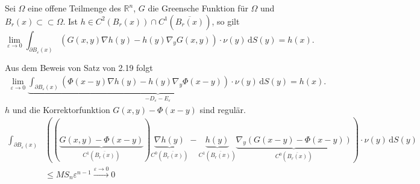 \begin{lemma}
	Sei $\Omega$ eine offene Teilmenge des $\mathbb{R}^n$, $G$ die Greensche Funktion für $\Omega$ und $B_r(x) \subset \subset \Omega$. 
	Ist $h \in C^2(B_r(x)) \cap C^1( \overline{B_r(x)})$, so gilt
	\begin{equation}
		\lim_{\varepsilon \to 0} \int_{\partial B _{\varepsilon}(x)}^{} \left( G(x,y)  \nabla h(y) - h(y)  \nabla_y G(x,y) \right) \cdot \nu(y) \,\mathrm{d}S(y) =
		h(x).
	\end{equation}
\end{lemma}
\begin{beweis}
	Aus dem Beweis von Satz von 2.19 folgt
	\begin{align*}
		\lim_{\varepsilon \to 0} \underset{-D_{\varepsilon}- E_{\varepsilon}}{\underbrace{\int_{\partial B_{\varepsilon}(x)}^{}\left( \Phi(x-y) 
		 \nabla h(y) - h(y)  \nabla_y \Phi(x-y) \right) \cdot \nu(y) \,\mathrm{d}S(y)}}=h(x).
	\end{align*}
	$h$ und die Korrektorfunktion $G(x,y)-\Phi(x-y)$ sind regulär.
	\begin{align}
		\int_{ \partial B_{\varepsilon}(x)}^{} &\left( \left( \underset{ C^1(\overline{B_r(x)})}{\underbrace{G(x,y)- \Phi(x-y)}} \right) 
		 \underset{ C^0(\overline{B_r(x)})}{\underbrace{\nabla h(y) }} - \underset{ C^1(\overline{B_r(x)})}{\underbrace{h(y)}} 
		  \underset{ C^0(\overline{B_r(x)})}{\underbrace{\nabla_y \left( G(x-y) -\Phi(x-y) \right)}} \right) \cdot \nu(y) \,\mathrm{d}S(y) \\
		   &\leq M S_n \varepsilon^{n-1} \stackrel{\varepsilon \to 0}{\to } 0
	\end{align}
\end{beweis}

